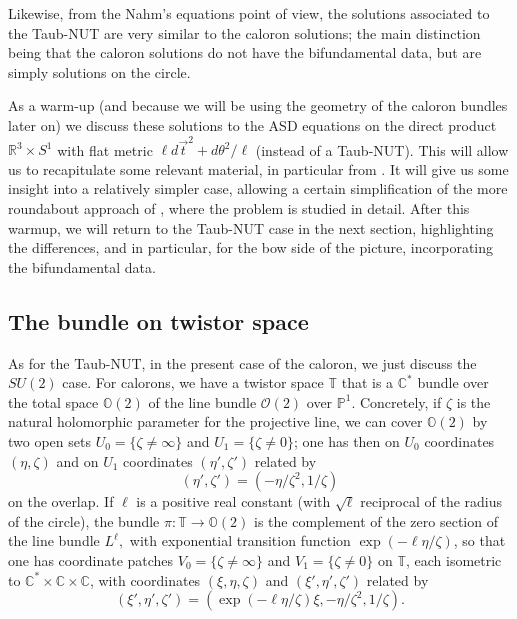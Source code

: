 \documentclass[12pt]{article}
\theoremstyle{definition}
\theoremstyle{remark}
\numberwithin{theorem}{section}
\def\bR{{\mathbb {R}}}
\def\bC{{\mathbb {C}}}
\def\bP{{\mathbb {P}}}
\def\bO{{\mathbb {O}}}
\def\bT{{\mathbb {T}}}
\def\pO{{\mathcal O}}
\begin{document}
 Likewise, from the Nahm's equations point of view, the solutions associated to the Taub-NUT are very similar to the caloron solutions; the main distinction being that the caloron solutions do not have the bifundamental data, but are simply solutions on the circle.
 
 As a warm-up (and because we will be using the geometry of the caloron bundles later on) we discuss these  solutions to the ASD equations  on the direct  product $\bR^3\times S^1$ with flat metric $\ell d\vec{t}^2+d\theta^2/\ell$ (instead of a Taub-NUT). This will allow us to recapitulate some relevant material, in particular from  \cite{Charbonneau:2006gu, Charbonneau:2007zd}.  It will give us some insight into a relatively simpler case, allowing a certain simplification of the more roundabout approach of \cite{Charbonneau:2006gu}, where the problem is studied in detail.  After this warmup, we will return to the Taub-NUT case in the next section, highlighting the differences, and in particular, for the bow side of the picture, incorporating the bifundamental data.
 
 \subsection{The bundle on twistor space}
 
As for the Taub-NUT, in the present case of the caloron, we  just discuss the $SU(2)$ case.  For calorons, we have a twistor space $\bT$ that is a $\bC^*$ bundle over the total space $\bO(2)$ of the line bundle $\pO(2)$ over $\bP^1$. Concretely, if $\zeta$ is the natural holomorphic parameter for the projective line, we can cover $\bO(2)$ by two open sets $U_0= \{\zeta\neq\infty\}$ and $U_1=  \{\zeta\neq 0\}$; one has then on $U_0$ coordinates $(\eta,\zeta)$ and on $U_1$ coordinates $(\eta',\zeta')$ related by 
$$( \eta',\zeta') = (-\eta/\zeta^2, 1/\zeta)$$ 
on the overlap.  If $\ell$ is a positive real constant (with $\sqrt{\ell}$  reciprocal of the radius of the circle), the bundle $\pi: \bT\rightarrow \bO(2)$  is the complement of the zero section of the line bundle $L^{\ell}, $ with exponential transition function $\exp(-\ell\eta/\zeta)$, so that one has coordinate patches $V_0= \{\zeta\neq\infty\}$ and   $V_1=  \{\zeta\neq 0\}$ on $\bT$, each isometric to $\mathbb{C}^*\times\mathbb{C}\times\mathbb{C}$, with  coordinates $(\xi, \eta,\zeta)$ and  $(\xi',\eta',\zeta')$ related by
$$(\xi', \eta',\zeta') = ( \exp(-\ell \eta/\zeta) \xi, -\eta/\zeta^2, 1/\zeta).$$ 
\end{document}
